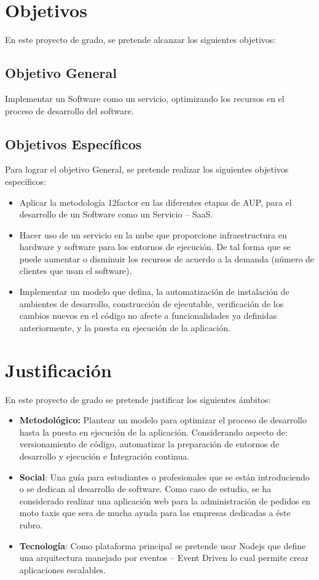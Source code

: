\section{Objetivos}
\noindent En este proyecto de grado, se pretende alcanzar los siguientes objetivos:

\subsection{Objetivo General}

\noindent Implementar un Software como un servicio, optimizando los recursos en el proceso de desarrollo del software. 


\subsection{Objetivos Específicos}

\noindent Para lograr el objetivo General, se pretende realizar los siguientes objetivos específicos:
\begin{itemize}
  \item Aplicar la metodología 12factor en las diferentes etapas de AUP, para el desarrollo de un Software como un Servicio – SaaS.
  \item Hacer uso de un servicio en la nube que proporcione  infraestructura en hardware y software para los entornos de ejecución. De tal forma que se puede aumentar o disminuir los recursos de acuerdo a la demanda (número de clientes que usan el software).
  \item Implementar un modelo que defina, la automatización de instalación de ambientes de desarrollo, construcción de ejecutable, verificación de los cambios nuevos en el código no afecte a funcionalidades ya definidas anteriormente, y la puesta en ejecución de la aplicación.
\end{itemize}

\section{Justificación}
\noindent En este proyecto de grado se pretende justificar los siguientes ámbitos:
\begin{itemize}
  \item \textbf{Metodológico:} Plantear un modelo para optimizar el proceso de desarrollo hasta la puesta en ejecución de la aplicación. Considerando aspecto de: versionamiento de código, automatizar la preparación de entornos de desarrollo y ejecución e Integración continua.
  \item \textbf{Social}: Una guía para estudiantes o profesionales que se están introduciendo o se dedican al desarrollo de software. Como caso de estudio, se ha considerado realizar una aplicación web para la administración de pedidos en moto taxis que sera de mucha ayuda para las empresas dedicadas a éste rubro.
  \item \textbf{Tecnología}: Como plataforma principal se pretende usar Nodejs que define una arquitectura manejado por eventos – Event Driven lo cual permite crear aplicaciones escalables.
\end{itemize}

